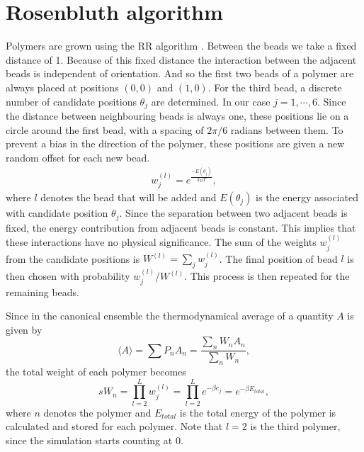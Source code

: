 \section{Rosenbluth algorithm}
Polymers are grown using the RR algorithm \cite{rosenbluth1955monte}. Between the beads we take a fixed distance of 1. Because of this fixed distance the interaction between the adjacent beads is independent of orientation. And so the first two beads of a polymer are always placed at positions $(0,0)$ and $(1,0)$. For the third bead, a discrete number of candidate positions $\theta_j$ are determined. In our case $j=1,\cdots,6$. Since the distance between neighbouring beads is always one, these positions lie on a circle around the first bead, with a spacing of $2\pi/6$ radians between them. To prevent a bias in the direction of the polymer, these positions are given a new random offset for each new bead.
\begin{gather}
    w_j^{(l)} = e^\frac{-E(\theta_j)}{k_BT},
\end{gather} where $l$ denotes the bead that will be added and $E(\theta_j)$ is the energy associated with candidate position $\theta_j$. Since the separation between two adjacent beads is fixed, the energy contribution from adjacent beads is constant. This implies that these interactions have no physical significance. The sum of the weights $w_j^{(l)}$ from the candidate positions is $W^{(l)} = \sum_j w_j^{(l)}$. The final position of bead $l$ is then chosen with probability $w_j^{(l)}/W^{(l)}$. This process is then repeated for the remaining beads.

Since in the canonical ensemble the thermodynamical average of a quantity $A$ is given by
\begin{equation}
\langle A \rangle = \sum P_nA_n = \frac{\sum_n W_n A_n}{\sum_n W_n},
\end{equation} the total weight of each polymer becomes
\begin{equation}\label{eq:polymer_weight}s
    W_n = \prod_{l=2}^L w_j^{(l)} = \prod_{l=2}^Le^{-\beta e_j} = e^{-\beta E_{total}},
\end{equation} where $n$ denotes the polymer and $E_{total}$ is the total energy of the polymer is calculated and stored for each polymer.  Note that $l=2$ is the third polymer, since the simulation starts counting at $0$.